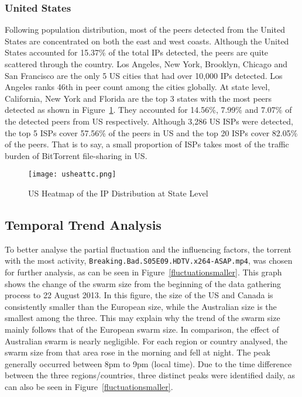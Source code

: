 \documentclass[conference]{IEEEtran}
\begin{document}
\subsubsection{United States}
Following population distribution, most of the peers detected from the United States are concentrated on both the east and west coasts. Although the United States accounted for 15.37\% of the total IPs detected, the peers are quite scattered through the country. Los Angeles, New York, Brooklyn, Chicago and San Francisco are the only 5 US cities that had over 10,000 IPs detected. Los Angeles ranks 46th in peer count among the cities globally. At state level, California, New York and Florida are the top 3 states with the most peers detected as shown in Figure~\ref{usheatmap}. They accounted for 14.56\%, 7.99\% and 7.07\% of the detected peers from US respectively.
Although 3,286 US ISPs were detected, the top 5 ISPs cover 57.56\% of the peers in US and the top 20 ISPs cover 82.05\% of the peers. That is to say, a small proportion of ISPs takes most of the traffic burden of BitTorrent file-sharing in US. 



\begin{figure}[!b]
\centering
\texttt{[image: usheattc.png]}
\caption{US Heatmap of the IP Distribution at State Level}
\label{usheatmap}
\end{figure}








\subsection{Temporal Trend Analysis}





To better analyse the partial fluctuation and the influencing factors, the torrent with the most activity, \texttt{Breaking.Bad.S05E09.HDTV.x264-ASAP.mp4}, was chosen for further analysis, as can be seen in Figure~\ref{fluctuationsmaller}. This graph shows the change of the swarm size from the beginning of the data gathering process to 22 August 2013. In this figure, the size of the US and Canada is consistently smaller than the European size, while the Australian size is the smallest among the three. This may explain why the trend of the swarm size mainly follows that of the European swarm size. 
In comparison, the effect of Australian swarm is nearly negligible. For each region or country analysed, the swarm size from that area rose in the morning and fell at night. The peak generally occurred between 8pm to 9pm (local time). Due to the time difference between the three regions/countries, three distinct peaks were identified daily, as can also be seen in Figure~\ref{fluctuationsmaller}. 
\end{document}
